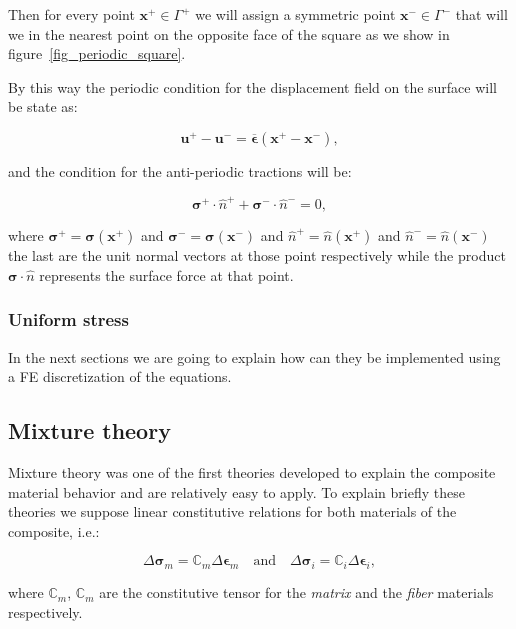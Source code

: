 \documentclass[3p]{elsarticle}
\begin{document}
Then for every point $\bm{x}^+ \in \Gamma^+$ we will assign a symmetric point $\bm{x}^- \in \Gamma^-$ that will we in
the nearest point on the opposite face of the square as we show in figure~\ref{fig_periodic_square}.

By this way the periodic condition for the displacement field on the surface will be state as:

\begin{equation}
\bm{u}^+ - \bm{u}^- = \overline{\bm{\epsilon}} (\bm{x}^+ - \bm{x}^-),
\end{equation}

\noindent
and the condition for the anti-periodic tractions will be:

\begin{equation}
\bm{\sigma}^{+} \cdot\hat{n}^+ + \bm{\sigma}^{-} \cdot\hat{n}^- = 0,
\end{equation}

\noindent
where $\bm{\sigma}^{+} = \bm{\sigma}(\bm{x}^{+})$ and $\bm{\sigma}^{-} = \bm{\sigma}(\bm{x}^{-})$
and $\hat{n}^+ = \hat{n}(\bm{x}^{+})$ and $\hat{n}^- = \hat{n}(\bm{x}^{-})$ the last are the unit normal vectors 
at those point respectively while the product $\bm{\sigma}\cdot\hat{n}$ represents the surface force at that point.

\subsubsection{Uniform stress}

In the next sections we are going to explain how can they be implemented using a FE discretization of the equations.

\subsection{Mixture theory}

Mixture theory was one of the first theories developed to explain the composite
material behavior and are relatively easy to apply. 
To explain briefly these theories we suppose linear constitutive relations for 
both materials of the composite, i.e.:

\begin{equation}
\Delta \bm{\sigma}_m = \mathbb{C}_m  \Delta \bm{\epsilon}_m 
\quad\text{and}\quad 
\Delta \bm{\sigma}_i = \mathbb{C}_i  \Delta \bm{\epsilon}_i,
\label{eq:const_im}
\end{equation}

\noindent
where $\mathbb{C}_m$, $\mathbb{C}_m$ are the constitutive tensor for the
\emph{matrix} and the \emph{fiber} materials respectively.
\end{document}
